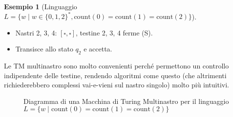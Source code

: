\documentclass[a4paper]{article}
\theoremstyle{definition} %
\newtheorem{example}{Esempio}
\newcommand{\blankS}{\ensuremath{\square}}
\begin{document}
\begin{example}[Linguaggio $L = \{w \mid w \in \{0,1,2\}^*, \text{count}(0)=\text{count}(1)=\text{count}(2)\}$]
\begin{itemize}
\begin{itemize}
\begin{itemize}
                    \item Nastri 2, 3, 4: $[\blankS, \blankS]$, testine 2, 3, 4 ferme (S).
                    \item Transisce allo stato $q_2$ e accetta.
                \end{itemize}
        \end{itemize}
\end{itemize}
Le TM multinastro sono molto convenienti perché permettono un controllo indipendente delle testine, rendendo algoritmi come questo (che altrimenti richiederebbero complessi vai-e-vieni sul nastro singolo) molto più intuitivi.
\end{example}

\begin{figure}[h!]
    \centering
    \caption{Diagramma di una Macchina di Turing Multinastro per il linguaggio $L=\{w \mid \text{count}(0)=\text{count}(1)=\text{count}(2)\}$}
\end{figure}
\end{document}
